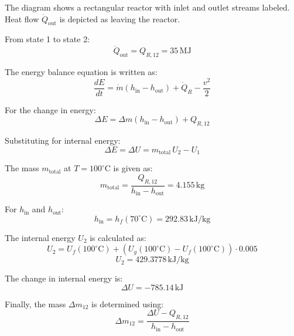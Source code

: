 The diagram shows a rectangular reactor with inlet and outlet streams labeled. Heat flow \( \dot{Q}_{\text{out}} \) is depicted as leaving the reactor.

From state 1 to state 2:
\[
\dot{Q}_{\text{out}} = Q_{R,12} = 35 \, \text{MJ}
\]

The energy balance equation is written as:
\[
\frac{dE}{dt} = \dot{m} \left( h_{\text{in}} - h_{\text{out}} \right) + \dot{Q}_R - \frac{v^2}{2}
\]

For the change in energy:
\[
\Delta E = \Delta m \left( h_{\text{in}} - h_{\text{out}} \right) + Q_{R,12}
\]

Substituting for internal energy:
\[
\Delta E = \Delta U = m_{\text{total}} \, U_2 - U_1
\]

The mass \( m_{\text{total}} \) at \( T = 100^\circ\text{C} \) is given as:
\[
m_{\text{total}} = \frac{Q_{R,12}}{h_{\text{in}} - h_{\text{out}}} = 4.155 \, \text{kg}
\]

For \( h_{\text{in}} \) and \( h_{\text{out}} \):
\[
h_{\text{in}} = h_f(70^\circ\text{C}) = 292.83 \, \text{kJ/kg}
\]

The internal energy \( U_2 \) is calculated as:
\[
U_2 = U_f(100^\circ\text{C}) + \left( U_g(100^\circ\text{C}) - U_f(100^\circ\text{C}) \right) \cdot 0.005
\]
\[
U_2 = 429.3778 \, \text{kJ/kg}
\]

The change in internal energy is:
\[
\Delta U = -785.14 \, \text{kJ}
\]

Finally, the mass \( \Delta m_{12} \) is determined using:
\[
\Delta m_{12} = \frac{\Delta U - Q_{R,12}}{h_{\text{in}} - h_{\text{out}}}
\]